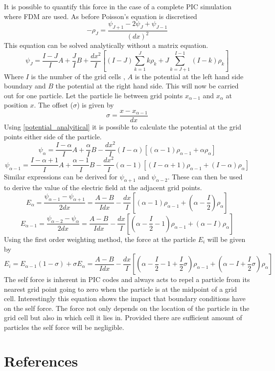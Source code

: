 \documentclass[12pt]{article}
\def\be{\begin{equation}}
\def\ee{\end{equation}}
\begin{document}
It is possible to quantify this force in the case of a complete PIC simulation where FDM are used. As before Poisson's equation is discretised 
\be 
-\rho_J = \frac{\psi_{J+1} - 2\psi_J + \psi_{J-1}}{(dx)^2}
\ee 
This equation can be solved analytically without a matrix equation.
\be 
\psi_J = \frac{I-J}{I} A + \frac{J}{I} B + \frac{dx^2}{I} \left[(I-J) \sum\limits_{k=1}^J k\rho_k   + J \sum\limits_{k=J+1}^{I-1} (I-k)\rho_k \right]
\label{potential_analyitical}
\ee
Where $I$ is the number of the grid cells , $A$ is the potential at the left hand side boundary and $B$ the potential at the right hand side. 
This will now be carried out for one particle. Let the particle lie between grid points $x_{\alpha -1}$ and $x_\alpha$ at position $x$. The offset ($\sigma$) is given by 
\be 
\sigma = \frac{x - x_{\alpha -1}}{dx}
\ee
Using \eqref{potential_analyitical} it is possible to calculate the potential at the grid points either side of the particle. 
\be
\psi_\alpha  = \frac{I-\alpha}{I}A +\frac{\alpha}{I}B - \frac{dx^2}{I}(I-\alpha) \left[(\alpha-1)\rho_{\alpha-1} + \alpha \rho_{\alpha} \right]
\ee
\be 
\psi_{\alpha -1} = \frac{I-\alpha +1}{I}A + \frac{\alpha - 1}{I} B -\frac{dx^2}{I}(\alpha -1) \left[(I-\alpha +1)\rho_{\alpha -1} + (I-\alpha)\rho_\alpha \right] 
\ee
Similar expressions can be derived for $\psi_{\alpha+1}$ and $\psi_{\alpha-2}$. These can then be used to derive the value of the electric field at the adjacent grid points. 
\be 
E_\alpha = \frac{\psi_{\alpha -1} - \psi_{\alpha +1}}{2 dx} = \frac{A-B}{I dx} - \frac{dx}{I}\left[(\alpha -1) \rho_{\alpha -1} + (\alpha -\frac{I}{2})\rho_\alpha \right]
\ee 
\be 
E_{\alpha-1} = \frac{\psi_{\alpha -2} - \psi_\alpha}{2 dx} = \frac{A-B}{I dx} - \frac{dx}{I} \left[(\alpha-\frac{I}{2}-1) \rho_{\alpha -1} +(\alpha-I) \rho_\alpha \right] 
\ee
Using the first order weighting method, the force at the particle $E_i$ will be given by 
\be 
E_i = E_{\alpha -1 } (1-\sigma) + \sigma E_\alpha = \frac{A - B}{I dx} - \frac{dx}{I} \left[(\alpha -\frac{I}{2} -1 + \frac{I}{2} \sigma) \rho_{\alpha -1} + (\alpha -I +\frac{I}{2} \sigma) \rho_\alpha \right]
\ee
The self force is inherent in PIC codes and always acts to repel a particle from its nearest grid point going to zero when the particle is at the midpoint of a grid cell. Interestingly this equation shows the impact that boundary conditions have on the self force. The force not only depends on the location of the particle in the grid cell but also in which cell it lies in. Provided there are sufficient amount of particles the self force will be negligible.
\newpage 
\section{References}

\end{document}
